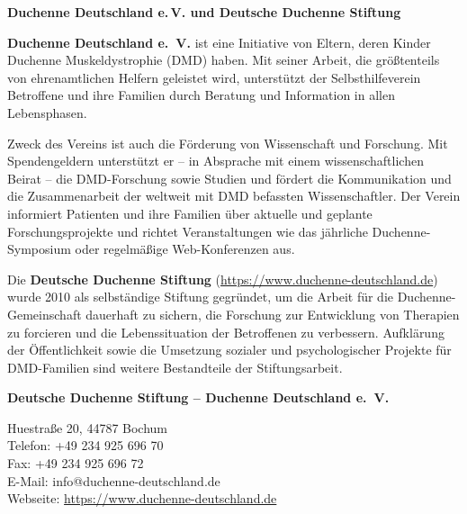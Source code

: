 \documentclass[fontsize=14pt,a4paper,headinclude,DIV=calc,automark]{scrbook}
\begin{document}
\begin{mdframed}[
    linewidth=0.3pt,         %
    linecolor=rahmenlinie,   %
    leftmargin=0, rightmargin=0,
    innertopmargin=12pt, innerbottommargin=12pt,
    innerleftmargin=12pt, innerrightmargin=12pt,
    backgroundcolor=white
]
\small\sffamily
\setlength{\parindent}{0pt} %

\textbf{Duchenne Deutschland e.\,V. und Deutsche Duchenne Stiftung}

\vspace{0.5\baselineskip}

\textbf{Duchenne Deutschland e.~V.} ist eine Initiative von Eltern, deren Kinder Duchenne Muskeldystrophie (DMD) haben. Mit seiner Arbeit, die größtenteils von ehrenamtlichen Helfern geleistet wird, unterstützt der Selbsthilfeverein Betroffene und ihre Familien durch Beratung und Information in allen Lebensphasen.

\vspace{0.8\baselineskip}

Zweck des Vereins ist auch die Förderung von Wissenschaft und Forschung. Mit Spendengeldern unterstützt er – in Absprache mit einem wissenschaftlichen Beirat – die DMD-Forschung sowie Studien und fördert die Kommunikation und die Zusammenarbeit der weltweit mit DMD befassten Wissenschaftler. Der Verein informiert Patienten und ihre Familien über aktuelle und geplante Forschungsprojekte und richtet Veranstaltungen wie das jährliche Duchenne-Symposium oder regelmäßige Web-Konferenzen aus.

\vspace{0.8\baselineskip}

Die \textbf{Deutsche Duchenne Stiftung} (\url{https://www.duchenne-deutschland.de}) wurde 2010 als selbständige Stiftung gegründet, um die Arbeit für die Duchenne-Gemeinschaft dauerhaft zu sichern, die Forschung zur Entwicklung von Therapien zu forcieren und die Lebenssituation der Betroffenen zu verbessern. Aufklärung der Öffentlichkeit sowie die Umsetzung sozialer und psychologischer Projekte für DMD-Familien sind weitere Bestandteile der Stiftungsarbeit.

\vspace{0.8\baselineskip}
\textbf{Deutsche Duchenne Stiftung – Duchenne Deutschland e.~V.}

Huestraße 20, 44787 Bochum\\
Telefon: +49 234 925 696 70\\
Fax: +49 234 925 696 72\\
E-Mail: info@duchenne-deutschland.de\\
Webseite: \url{https://www.duchenne-deutschland.de}


\end{mdframed}
\end{document}
